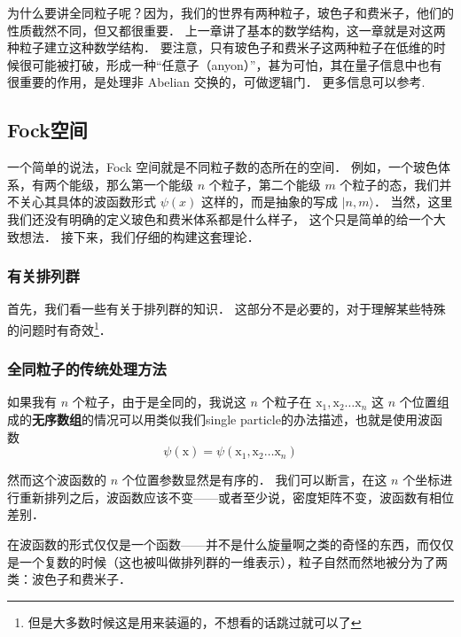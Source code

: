 
为什么要讲全同粒子呢？因为，我们的世界有两种粒子，玻色子和费米子，他们的性质截然不同，但又都很重要． 上一章讲了基本的数学结构，这一章就是对这两种粒子建立这种数学结构． 要注意，只有玻色子和费米子这两种粒子在低维的时候很可能被打破，形成一种“任意子（anyon）”，甚为可怕，其在量子信息中也有很重要的作用，是处理非 Abelian 交换的，可做逻辑门． 更多信息可以参考\cite{Nayak2008}.

\subsection{Fock空间}

一个简单的说法，Fock 空间就是不同粒子数的态所在的空间． 例如，一个玻色体系，有两个能级，那么第一个能级 $n$ 个粒子，第二个能级 $m$ 个粒子的态，我们并不关心其具体的波函数形式 $\psi(x)$ 这样的，而是抽象的写成 $|n,m\rangle$． 当然，这里我们还没有明确的定义玻色和费米体系都是什么样子， 这个只是简单的给一个大致想法． 接下来，我们仔细的构建这套理论．

\subsubsection{有关排列群}

首先，我们看一些有关于排列群的知识． 这部分不是必要的，对于理解某些特殊的问题时有奇效\footnote{但是大多数时候这是用来装逼的，不想看的话跳过就可以了}．

\subsubsection{全同粒子的传统处理方法}

如果我有 $n$ 个粒子，由于是全同的，我说这 $n$ 个粒子在 ${\mathrm x}_1, {\mathrm x}_2 \dots {\mathrm x}_n$ 这 $n$ 个位置组成的\textbf{无序数组}的情况可以用类似我们single particle的办法描述，也就是使用波函数
\begin{equation}
\psi({\mathrm x}) = \psi({\mathrm x}_1, {\mathrm x}_2\dots {\mathrm x}_n)
\end{equation}

然而这个波函数的 $n$ 个位置参数显然是有序的． 我们可以断言，在这 $n$ 个坐标进行重新排列之后，波函数应该不变——或者至少说，密度矩阵不变，波函数有相位差别．

在波函数的形式仅仅是一个函数——并不是什么旋量啊之类的奇怪的东西，而仅仅是一个复数的时候（这也被叫做排列群的一维表示），粒子自然而然地被分为了两类：波色子和费米子．

